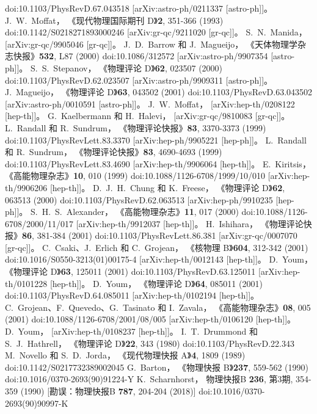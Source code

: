 \documentclass[jkps,preprint,fleqn]{revtex4}
\begin{document}
\begin{thebibliography}{999}
doi:10.1103/PhysRevD.67.043518  
[arXiv:astro-ph/0211337 [astro-ph]]。  
J.~W.~Moffat，  
《现代物理国际期刊 D》\textbf{2}, 351-366 (1993)  
doi:10.1142/S0218271893000246  
[arXiv:gr-qc/9211020 [gr-qc]]。  
S.~N.~Manida，  
[arXiv:gr-qc/9905046 [gr-qc]]。  
J.~D.~Barrow 和 J.~Magueijo，  
《天体物理学杂志快报》\textbf{532}, L87 (2000)  
doi:10.1086/312572  
[arXiv:astro-ph/9907354 [astro-ph]]。  
S.~S.~Stepanov，  
《物理评论 D》\textbf{62}, 023507 (2000)  
doi:10.1103/PhysRevD.62.023507  
[arXiv:astro-ph/9909311 [astro-ph]]。  
J.~Magueijo，  
《物理评论 D》\textbf{63}, 043502 (2001)  
doi:10.1103/PhysRevD.63.043502  
[arXiv:astro-ph/0010591 [astro-ph]]。  
J.~W.~Moffat，  
[arXiv:hep-th/0208122 [hep-th]]。  
G.~Kaelbermann 和 H.~Halevi，  
[arXiv:gr-qc/9810083 [gr-qc]]。  
L.~Randall 和 R.~Sundrum，  
《物理评论快报》\textbf{83}, 3370-3373 (1999)  
doi:10.1103/PhysRevLett.83.3370  
[arXiv:hep-ph/9905221 [hep-ph]]。  
L.~Randall 和 R.~Sundrum，  
《物理评论快报》\textbf{83}, 4690-4693 (1999)  
doi:10.1103/PhysRevLett.83.4690  
[arXiv:hep-th/9906064 [hep-th]]。  
E.~Kiritsis，  
《高能物理杂志》\textbf{10}, 010 (1999)  
doi:10.1088/1126-6708/1999/10/010  
[arXiv:hep-th/9906206 [hep-th]]。  
D.~J.~H.~Chung 和 K.~Freese，  
《物理评论 D》\textbf{62}, 063513 (2000)  
doi:10.1103/PhysRevD.62.063513  
[arXiv:hep-ph/9910235 [hep-ph]]。  
S.~H.~S.~Alexander，  
《高能物理杂志》\textbf{11}, 017 (2000)  
doi:10.1088/1126-6708/2000/11/017  
[arXiv:hep-th/9912037 [hep-th]]。  
H.~Ishihara，  
《物理评论快报》\textbf{86}, 381-384 (2001)  
doi:10.1103/PhysRevLett.86.381  
[arXiv:gr-qc/0007070 [gr-qc]]。  
C.~Csaki、J.~Erlich 和 C.~Grojean，  
《核物理 B》\textbf{604}, 312-342 (2001)  
doi:10.1016/S0550-3213(01)00175-4  
[arXiv:hep-th/0012143 [hep-th]]。  
D.~Youm，  
《物理评论 D》\textbf{63}, 125011 (2001)  
doi:10.1103/PhysRevD.63.125011  
[arXiv:hep-th/0101228 [hep-th]]。  
D.~Youm，  
《物理评论 D》\textbf{64}, 085011 (2001)  
doi:10.1103/PhysRevD.64.085011  
[arXiv:hep-th/0102194 [hep-th]]。  
C.~Grojean、F.~Quevedo、G.~Tasinato 和 I.~Zavala，  
《高能物理杂志》\textbf{08}, 005 (2001)  
doi:10.1088/1126-6708/2001/08/005  
[arXiv:hep-th/0106120 [hep-th]]。  
D.~Youm，  
[arXiv:hep-th/0108237 [hep-th]]。  
I.~T.~Drummond 和 S.~J.~Hathrell，  
《物理评论 D》\textbf{22}, 343 (1980)  
doi:10.1103/PhysRevD.22.343  
M.~Novello 和 S.~D.~Jorda，  
《现代物理快报 A》\textbf{4}, 1809 (1989)  
doi:10.1142/S0217732389002045  
G.~Barton，  
《物理快报 B》\textbf{237}, 559-562 (1990)  
doi:10.1016/0370-2693(90)91224-Y  
K.~Scharnhorst，
物理快报B \textbf{236}, 第3期, 354-359 (1990)  
[勘误：物理快报B \textbf{787}, 204-204 (2018)]  
doi:10.1016/0370-2693(90)90997-K  


\end{thebibliography}
\end{document}

